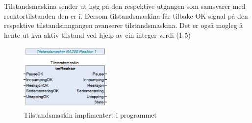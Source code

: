 Tilstandsmaskina sender ut høg på den respektive utgangen som samsvarer med reaktortilstanden den er i. Dersom tilstandsmaskina får tilbake
OK signal på den respektive tilstandsinngangen avanserer tilstandsmaskina.
Det er også mogleg å hente ut kva aktiv tilstand ved hjelp av ein integer verdi (1-5)

\begin{figure}[htbp]
    \centering
    \includegraphics[width=0.4\textwidth]{Bilder/Tilstandsmaskin.png}
    \caption{Tilstandsmaskin implimentert i programmet}\label{fig:TilstandsmaskinIProgram}
\end{figure}


